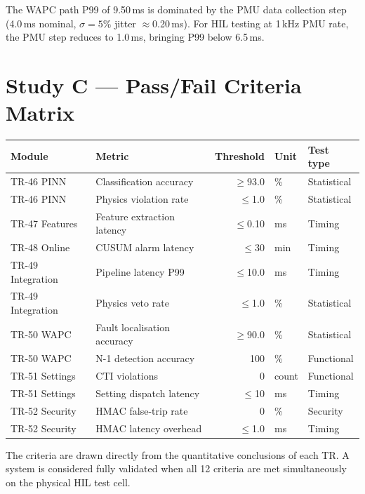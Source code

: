 \documentclass[11pt,a4paper]{article}
\begin{document}
\medskip\noindent
The WAPC path P99 of 9.50\,ms is dominated by the PMU data collection
step (4.0\,ms nominal, $\sigma=5\%$ jitter $\approx$0.20\,ms).  For HIL
testing at 1\,kHz PMU rate, the PMU step reduces to 1.0\,ms, bringing
P99 below 6.5\,ms.

\section{Study C --- Pass/Fail Criteria Matrix}
\label{sec:studyC}

\begin{center}
\begin{tabular}{@{}llrll@{}}
\toprule
Module & Metric & Threshold & Unit & Test type \\
\midrule
TR-46 PINN & Classification accuracy & $\geq$93.0 & \% & Statistical \\
TR-46 PINN & Physics violation rate & $\leq$1.0 & \% & Statistical \\
TR-47 Features & Feature extraction latency & $\leq$0.10 & ms & Timing \\
TR-48 Online & CUSUM alarm latency & $\leq$30 & min & Timing \\
TR-49 Integration & Pipeline latency P99 & $\leq$10.0 & ms & Timing \\
TR-49 Integration & Physics veto rate & $\leq$1.0 & \% & Statistical \\
TR-50 WAPC & Fault localisation accuracy & $\geq$90.0 & \% & Statistical \\
TR-50 WAPC & N-1 detection accuracy & 100 & \% & Functional \\
TR-51 Settings & CTI violations & 0 & count & Functional \\
TR-51 Settings & Setting dispatch latency & $\leq$10 & ms & Timing \\
TR-52 Security & HMAC false-trip rate & 0 & \% & Security \\
TR-52 Security & HMAC latency overhead & $\leq$1.0 & ms & Timing \\
\bottomrule
\end{tabular}
\end{center}

\medskip\noindent
The criteria are drawn directly from the quantitative conclusions of each
TR.  A system is considered fully validated when all 12 criteria are met
simultaneously on the physical HIL test cell.

\end{document}
